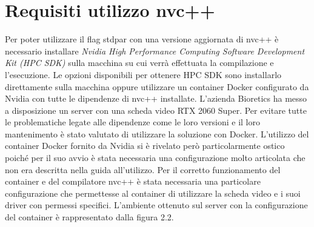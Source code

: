 \documentclass[12pt,a4paper]{report}
\begin{document}
\section{Requisiti utilizzo nvc++}
Per poter utilizzare il flag stdpar con una versione aggiornata di nvc++ è necessario installare \textit{Nvidia High Performance Computing Software Development Kit (HPC SDK)} sulla macchina su cui verrà effettuata la compilazione e l'esecuzione. Le opzioni disponibili per ottenere HPC SDK sono installarlo direttamente sulla macchina oppure utilizzare un container Docker configurato da Nvidia con tutte le dipendenze di nvc++ installate. \newline
L'azienda Bioretics ha messo a disposizione un server con una scheda video RTX 2060 Super. Per evitare tutte le problematiche legate alle dipendenze come le loro versioni e il loro mantenimento è stato valutato di utilizzare la soluzione con Docker. \newline
L'utilizzo del container Docker fornito da Nvidia si è rivelato però particolarmente ostico poiché per il suo avvio è stata necessaria una configurazione molto articolata che non era descritta nella guida all'utilizzo. Per il corretto funzionamento del container e del compilatore nvc++ è stata necessaria una particolare configurazione che permettesse al container di utilizzare la scheda video e i suoi driver con permessi specifici. 
L'ambiente ottenuto sul server con la configurazione del container è rappresentato dalla figura 2.2.

\begin{figure}[H]
\centering
\begin{floatrow}[1]
\end{floatrow}
\end{figure} \newpage
\end{document}
